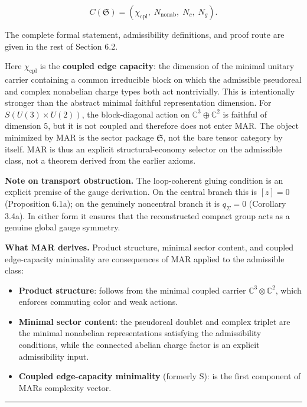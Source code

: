 \[C(\mathfrak S) = (\chi_{\mathrm{cpl}},\; N_{\mathrm{nonab}},\; N_c,\; N_g).\]

The complete formal statement, admissibility definitions, and proof route are given in the rest of Section 6.2.

Here \(\chi_{\mathrm{cpl}}\) is the \textbf{coupled edge capacity}: the dimension of the minimal unitary carrier containing a common irreducible block on which the admissible pseudoreal and complex nonabelian charge types both act nontrivially. This is intentionally stronger than the abstract minimal faithful representation dimension. For \(S(U(3)\times U(2))\), the block-diagonal action on \(\mathbb{C}^3 \oplus \mathbb{C}^2\) is faithful of dimension \(5\), but it is not coupled and therefore does not enter MAR. The object minimized by MAR is the sector package \(\mathfrak S\), not the bare tensor category by itself. MAR is thus an explicit structural-economy selector on the admissible class, not a theorem derived from the earlier axioms.

\textbf{Note on transport obstruction.} The loop-coherent gluing condition is an explicit premise of the gauge derivation. On the central branch this is \([z]=0\) (Proposition 6.1a); on the genuinely noncentral branch it is \(q_\Sigma=0\) (Corollary 3.4a). In either form it ensures that the reconstructed compact group acts as a genuine global gauge symmetry.

\textbf{What MAR derives.} Product structure, minimal sector content, and coupled edge-capacity minimality are consequences of MAR applied to the admissible class:

\begin{itemize}
\tightlist
\item
  \textbf{Product structure}: follows from the minimal coupled carrier \(\mathbb{C}^3 \otimes \mathbb{C}^2\), which enforces commuting color and weak actions.
\item
  \textbf{Minimal sector content}: the pseudoreal doublet and complex triplet are the minimal nonabelian representations satisfying the admissibility conditions, while the connected abelian charge factor is an explicit admissibility input.
\item
  \textbf{Coupled edge-capacity minimality} (formerly S): is the first component of MAR\textquotesingle s complexity vector.
\end{itemize}

\begin{center}\rule{0.5\linewidth}{0.5pt}\end{center}

